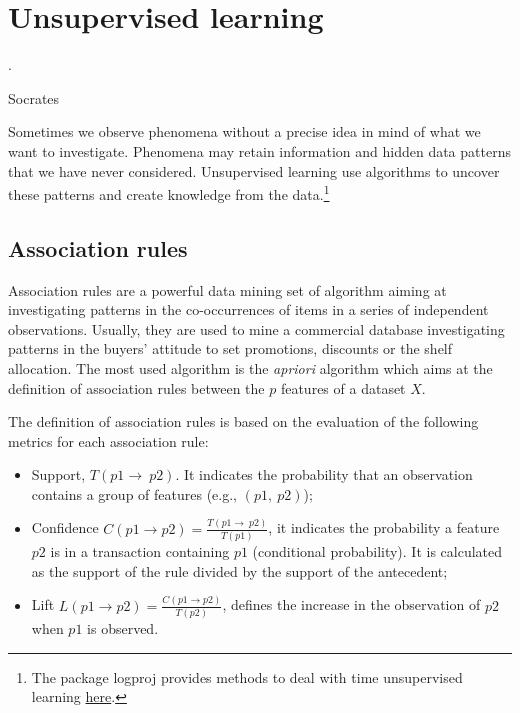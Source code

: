 \chapter{Unsupervised learning}
\label{chapUnsupervisedLearning}

\epigraph{.}{Socrates}


Sometimes we observe phenomena without a precise idea in mind of what we want to investigate. Phenomena may retain information and hidden data patterns that we have never considered. Unsupervised learning use algorithms to uncover these patterns and create knowledge from the data.\footnote{The package logproj provides methods to deal with time unsupervised learning \href{https://github.com/aletuf93/logproj/blob/master/logproj/ml_unsupervised_models.py}{here}.} 

\section{Association rules} \label{secAssociationRules}
Association rules are a powerful data mining set of algorithm aiming at investigating patterns in the co-occurrences of items in a series of independent observations. Usually, they are used to mine a commercial database investigating patterns in the buyers’ attitude to set promotions, discounts or the shelf allocation. The most used algorithm is the \textit{apriori} algorithm which aims at the definition of association rules between the $p$ features of a dataset $X$.\par

The definition of association rules is based on the evaluation of the following metrics for each association rule:
\begin{itemize}
    \item Support, $T\left(p1\rightarrow\ p2\right)$. It indicates the probability that an observation contains a group of features (e.g., $(p1,\ p2)$);
    \item 	Confidence $C\left(p1\rightarrow p2\right)=\frac{T\left(p1\rightarrow\ p2\right)}{T(p1)}$, it indicates the probability a feature $p2$ is in a transaction containing $p1$ (conditional probability). It is calculated as the support of the rule divided by the support of the antecedent;
    \item 	Lift $L\left(p1\rightarrow p2\right)=\frac{C\left(p1\rightarrow p2\right)}{T(p2)}$, defines the increase in the observation of $p2$ when $p1$ is observed. 
\end{itemize}


